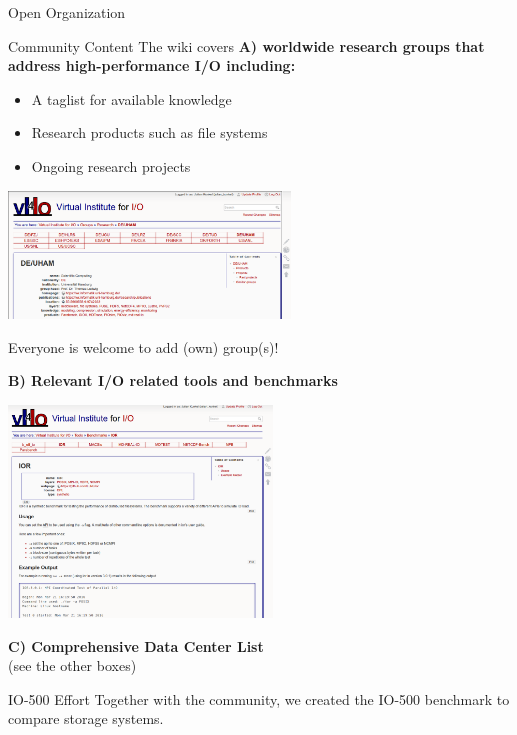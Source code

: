 \documentclass[portrait,a0paper,fontscale=0.4]{baposter}
\newcommand{\compresslist}{%
\setlength{\itemsep}{1pt}%
\setlength{\parskip}{0pt}%
\setlength{\parsep}{0pt}%
}
\begin{document}
\begin{poster}
\begin{posterbox}[name=overview,column=0,below=approach]{Open Organization}
\end{posterbox}


\begin{posterbox}[name=wps,column=0,below=overview, above=bottom]{Community Content}
The wiki covers \textbf{A) worldwide research groups that address high-performance I/O including:}

\vspace*{-1em}
\begin{itemize}\compresslist
\item A taglist for available knowledge
\item Research products such as file systems
\item Ongoing research projects
\end{itemize}

\vspace*{-0.5em}

\includegraphics[width=7.5cm]{groups}

Everyone is welcome to add (own) group(s)!

\textbf{B) Relevant I/O related tools and benchmarks}

\includegraphics[width=7cm]{benchmark}


\textbf{C) Comprehensive Data Center List} \\ (see the other boxes)

\medskip

\end{posterbox}


\begin{posterbox}[name=io500,column=1,span=2]{IO-500 Effort}
Together with the community, we created the IO-500 benchmark to compare storage systems.


\end{posterbox}
\end{poster}
\end{document}
